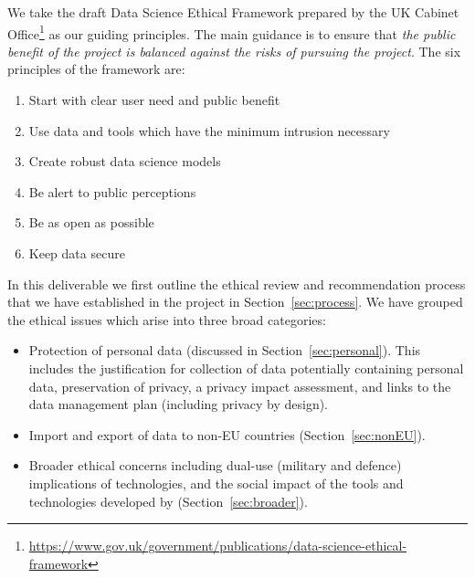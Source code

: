 We take the draft Data Science Ethical Framework  prepared by the UK Cabinet Office\footnote{\url{https://www.gov.uk/government/publications/data-science-ethical-framework}} as our guiding principles.  The main guidance is to ensure that \emph{the public benefit of the project is balanced against the risks of pursuing the project}.  The six principles of the framework are:
\begin{enumerate}
    \item Start with clear user need and public benefit
    \item Use data and tools which have the minimum intrusion necessary
    \item Create robust data science models
    \item Be alert to public perceptions
    \item Be as open as possible
    \item Keep data secure
\end{enumerate}

In this deliverable we first outline the ethical review and recommendation process that we have established in the \project project in Section~\ref{sec:process}.  We have grouped the ethical issues which arise into three broad categories:

\begin{itemize}
    \item Protection of personal data (discussed in Section~\ref{sec:personal}).  This includes the justification for collection of data potentially containing personal data, preservation of privacy, a privacy impact assessment, and links to the data management plan (including privacy by design).
    
    \item Import and export of data to non-EU countries (Section~\ref{sec:nonEU}).
    
    \item Broader ethical concerns including dual-use  (military and defence) implications of \project technologies, and the social impact of the tools and technologies developed by \project (Section~\ref{sec:broader}).
\end{itemize}

